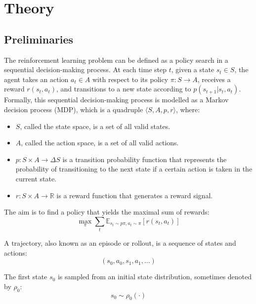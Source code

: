 \newpage
\section{Theory} \label{sec:theory}
{
\setlength{\parindent}{0pt}
\setlength{\parskip}{1.5ex}

\subsection{Preliminaries}

The reinforcement learning problem can be defined as a policy search in a sequential decision-making process. At each time step $t$, given a state $s_t \in S$, the agent takes an action $a_t \in A$ with respect to its policy $\pi \colon S \to A$, receives a reward $r(s_t, a_t)$, and transitions to a new state according to $p(s_{t+1}|s_t, a_t)$. Formally, this sequential decision-making process is modelled as a Markov decision process (MDP), which is a quadruple $\langle S, A, p, r \rangle$, where:
\begin{itemize}
\item $S$, called the state space, is a set of all valid states.
\item $A$, called the action space, is a set of all valid actions.
\item $p \colon S \times A \to \Delta S$ is a transition probability function that represents the probability of transitioning to the next state if a certain action is taken in the current state.
\item $r \colon S \times A \to \mathbb{R}$ is a reward function that generates a reward signal.
\end{itemize}

The aim is to find a policy that yields the maximal sum of rewards:
\begin{displaymath}
\max_{\pi} \sum_{t} \mathbb{E}_{s_t \sim p\pi, a_t \sim \pi} \left[ r(s_t,a_t) \right]
\end{displaymath}

A trajectory, also known as an episode or rollout, is a sequence of states and actions:
\begin{displaymath}
(s_0, a_0, s_1, a_1, \ldots)
\end{displaymath}

The first state $s_0$ is sampled from an initial state distribution, sometimes denoted by $\rho_0$:
\begin{displaymath}
s_0 \sim \rho_0(\cdot)
\end{displaymath}

}
